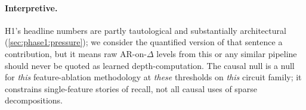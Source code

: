 \paragraph{Interpretive.}
H1's headline numbers are partly tautological and substantially architectural
(\cref{sec:phase1:pressure}); we consider the quantified version of that
sentence a contribution, but it means raw AR-on-$\Delta$ levels from this or
any similar pipeline should never be quoted as learned depth-computation. The
causal null is a null for \emph{this} feature-ablation methodology at
\emph{these} thresholds on \emph{this} circuit family; it constrains
single-feature stories of recall, not all causal uses of sparse
decompositions.
